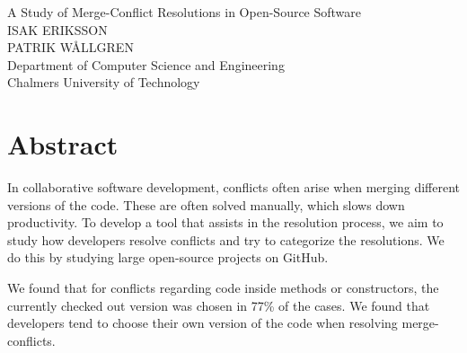 A Study of Merge-Conflict Resolutions in Open-Source Software\\

ISAK ERIKSSON\\
PATRIK WÅLLGREN\\
Department of Computer Science and Engineering\\
Chalmers University of Technology \setlength{\parskip}{0.5cm}

\thispagestyle{plain}			%
\section*{Abstract}
In collaborative software development, conflicts often arise when merging different versions of the code. These are often solved manually, which slows down productivity. To develop a tool that assists in the resolution process, we aim to study how developers resolve conflicts and try to categorize the resolutions. We do this by studying large open-source projects on GitHub.

We found that for conflicts regarding code inside methods or constructors, the currently checked out version was chosen in 77\% of the cases. We found that developers tend to choose their own version of the code when resolving merge-conflicts.


\newpage				%
\thispagestyle{empty}
\mbox{}


